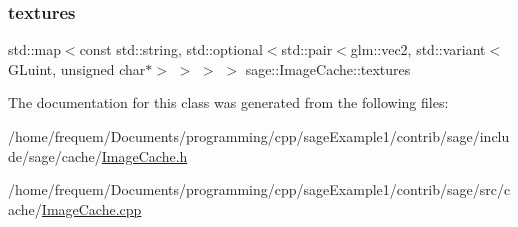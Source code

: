 \mbox{\label{classsage_1_1ImageCache_a01b8aa5587b2cf9c5e1f1059431f0118}} 
\subsubsection{\texorpdfstring{textures}{textures}}
{\footnotesize\ttfamily std\+::map$<$const std\+::string, std\+::optional$<$std\+::pair$<$glm\+::vec2, std\+::variant$<$G\+Luint, unsigned char$\ast$$>$ $>$ $>$ $>$ sage\+::\+Image\+Cache\+::textures\hspace{0.3cm}{\ttfamily [private]}}



The documentation for this class was generated from the following files\+:\begin{DoxyCompactItemize}
\item 
/home/frequem/\+Documents/programming/cpp/sage\+Example1/contrib/sage/include/sage/cache/\mbox{\hyperlink{ImageCache_8h}{Image\+Cache.\+h}}\item 
/home/frequem/\+Documents/programming/cpp/sage\+Example1/contrib/sage/src/cache/\mbox{\hyperlink{ImageCache_8cpp}{Image\+Cache.\+cpp}}\end{DoxyCompactItemize}
